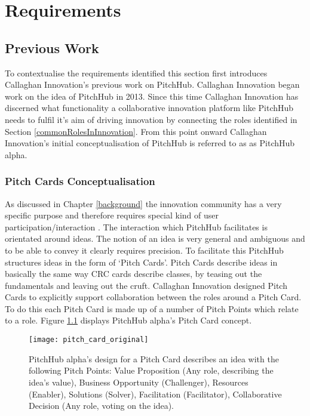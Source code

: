 \chapter{Requirements}\label{C:requirements}

\section{Previous Work}

To contextualise the requirements identified this section first introduces Callaghan Innovation's previous work on PitchHub. Callaghan Innovation began work on the idea of PitchHub in 2013. Since this time Callaghan Innovation has discerned what functionality a collaborative innovation platform like PitchHub needs to fulfil it's aim of driving innovation by connecting the roles identified in Section \ref{commonRolesInInnovation}. From this point onward Callaghan Innovation's initial conceptualisation of PitchHub is referred to as as PitchHub alpha.

\subsection{Pitch Cards Conceptualisation}
As discussed in Chapter \ref{background} the innovation community has a very specific purpose and therefore requires special kind of user participation/interaction \cite{Jruby:online}. The interaction which PitchHub facilitates is orientated around ideas. The notion of an idea is very general and ambiguous and to be able to convey it clearly requires precision. To facilitate this PitchHub structures ideas in the form of `Pitch Cards'. Pitch Cards describe ideas in basically the same way CRC cards describe classes, by teasing out the fundamentals and leaving out the cruft. Callaghan Innovation designed Pitch Cards to explicitly support collaboration between the roles around a Pitch Card. To do this each Pitch Card is made up of a number of Pitch Points which relate to a role. Figure \ref{fig:pitch_card_original} displays PitchHub alpha's Pitch Card concept.
\begin{figure}[ht]
    \centering
    \texttt{[image: pitch\_card\_original]}
    \caption{PitchHub alpha's design for a Pitch Card describes an idea with the following Pitch Points: Value Proposition (Any role, describing the idea's value), Business Opportunity (Challenger), Resources (Enabler), Solutions (Solver), Facilitation (Facilitator), Collaborative Decision (Any role, voting on the idea).}
    \label{fig:pitch_card_original}
\end{figure}

